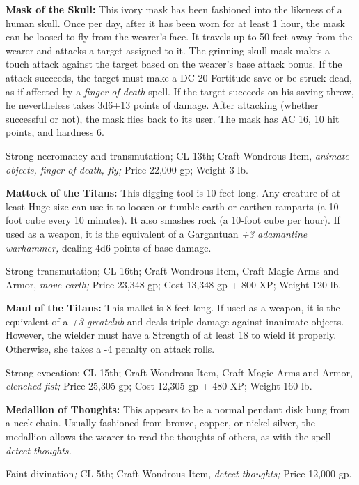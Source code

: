 \documentclass{article}
\begin{document}
\textbf{Mask of the Skull:} This ivory mask has been fashioned into the likeness 
of a human skull. Once per day, after it has been worn for at least 1 hour, the 
mask can be loosed to fly from the wearer's face. It travels up to 50 feet away 
from the wearer and attacks a target assigned to it. The grinning skull mask makes 
a touch attack against the target based on the wearer's base attack bonus. If the 
attack succeeds, the target must make a DC 20 Fortitude save or be struck dead, 
as if affected by a \textit{finger of death }spell. If the target succeeds on his 
saving throw, he nevertheless takes 3d6+13 points of damage. After attacking (whether 
successful or not), the mask flies back to its user. The mask has AC 16, 10 hit 
points, and hardness 6.

Strong necromancy and transmutation; CL 13th; Craft Wondrous Item, \textit{animate 
objects, finger of death, fly; }Price 22,000 gp; Weight 3 lb.

\textbf{Mattock of the Titans:} This digging tool is 10 feet long. Any creature 
of at least Huge size can use it to loosen or tumble earth or earthen ramparts 
(a 10-foot cube every 10 minutes). It also smashes rock (a 10-foot cube per hour). 
If used as a weapon, it is the equivalent of a Gargantuan \textit{+3 adamantine 
warhammer, }dealing 4d6 points of base damage.

Strong transmutation; CL 16th; Craft Wondrous Item, Craft Magic Arms and Armor, 
\textit{move earth; }Price 23,348 gp; Cost 13,348 gp + 800 XP; Weight 120 lb.

\textbf{Maul of the Titans:} This mallet is 8 feet long. If used as a weapon, it 
is the equivalent of a \textit{+3 greatclub }and deals triple damage against inanimate 
objects. However, the wielder must have a Strength of at least 18 to wield it properly. 
Otherwise, she takes a -4 penalty on attack rolls.

Strong evocation; CL 15th; Craft Wondrous Item, Craft Magic Arms and Armor, \textit{clenched 
fist; }Price 25,305 gp; Cost 12,305 gp + 480 XP; Weight 160 lb.

\textbf{Medallion of Thoughts:} This appears to be a normal pendant disk hung from 
a neck chain. Usually fashioned from bronze, copper, or nickel-silver, the medallion 
allows the wearer to read the thoughts of others, as with the spell \textit{detect 
thoughts.}

Faint divination\textit{; }CL 5th; Craft Wondrous Item, \textit{detect thoughts; 
}Price 12,000 gp.
\end{document}
